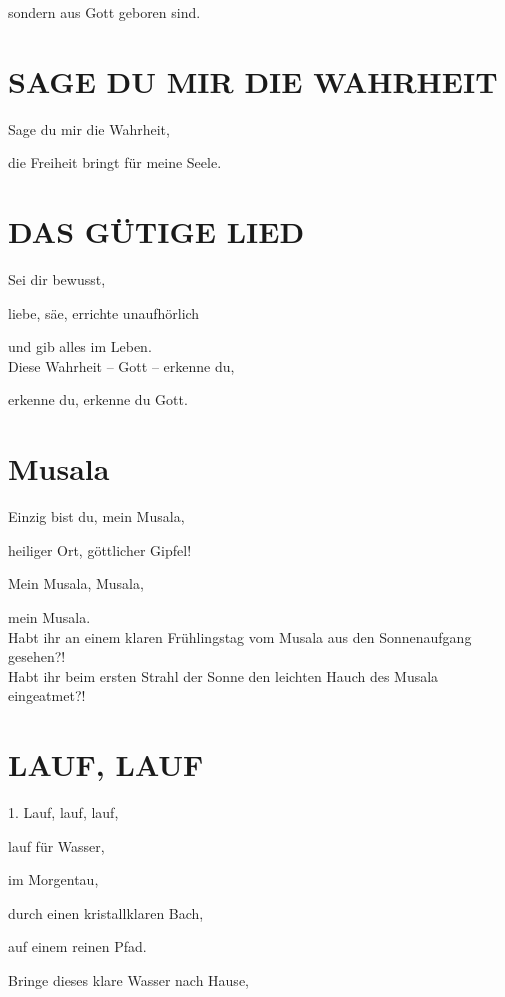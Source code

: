 \documentclass[11pt,a5paper,twoside]{article}
\begin{document}
sondern aus Gott geboren sind. 

\section[Sage du mir die Wahrheit]{SAGE DU MIR DIE WAHRHEIT}

Sage du mir die Wahrheit,

die Freiheit bringt für meine Seele. 

\section[Das gütige Lied]{DAS GÜTIGE LIED}

Sei dir bewusst, 

liebe, säe, errichte unaufhörlich

und gib alles im Leben.\\


Diese Wahrheit -- Gott -- erkenne du,

erkenne du, erkenne du Gott.

\section[Musala]{Musala}

Einzig bist du, mein Musala,

heiliger Ort, göttlicher Gipfel!

Mein Musala, Musala,

mein Musala.\\

Habt ihr an einem klaren Frühlingstag vom Musala aus den Sonnenaufgang gesehen?!\\

Habt ihr beim ersten Strahl der Sonne den leichten Hauch des Musala eingeatmet?!\\

\section[Lauf, lauf]{LAUF, LAUF}

1. Lauf, lauf, lauf, 

lauf für Wasser,

im Morgentau, 

durch einen kristallklaren Bach,

auf einem reinen Pfad. 

Bringe dieses klare Wasser nach Hause, 
\end{document}
